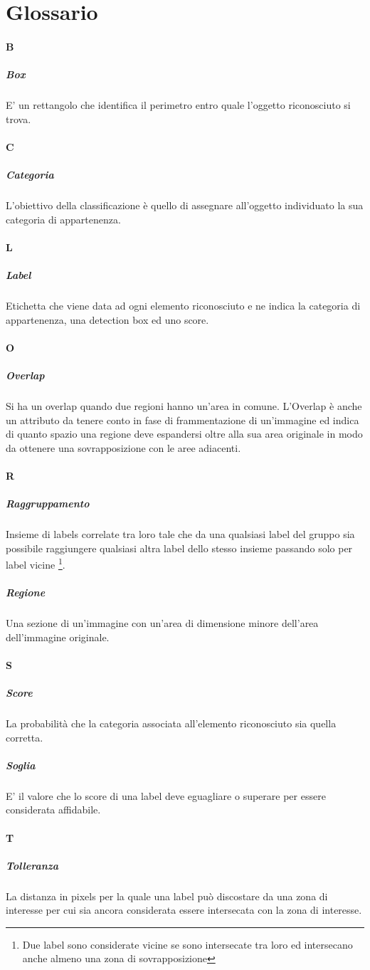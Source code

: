 \section{Glossario}

\paragraph{B}
\subparagraph{Box}
E' un rettangolo che identifica il perimetro entro quale l'oggetto riconosciuto si trova.

\paragraph{C}
\subparagraph{Categoria}
L'obiettivo della classificazione è quello di assegnare all'oggetto individuato la sua categoria di appartenenza.

\paragraph{L}
\subparagraph{Label}
Etichetta che viene data ad ogni elemento riconosciuto e ne indica la categoria di appartenenza, una detection box ed uno score.

\paragraph{O}
\subparagraph{Overlap} Si ha un overlap quando due regioni hanno un'area in comune. L'Overlap è anche un attributo da tenere conto in fase di frammentazione di un'immagine ed indica di quanto spazio una regione deve espandersi oltre alla sua area originale in modo da ottenere una sovrapposizione con le aree adiacenti.

\paragraph{R}
\subparagraph{Raggruppamento}
Insieme di labels correlate tra loro tale che da una qualsiasi label del gruppo sia possibile raggiungere qualsiasi altra label dello stesso insieme passando solo per label vicine \footnote{Due label sono considerate vicine se sono intersecate tra loro ed intersecano anche almeno una zona di sovrapposizione}.
\subparagraph{Regione} Una sezione di un'immagine con un'area di dimensione minore dell'area dell'immagine originale.

\paragraph{S}
\subparagraph{Score} La probabilità che la categoria associata all'elemento riconosciuto sia quella corretta.
\subparagraph{Soglia} E' il valore che lo score di una label deve eguagliare o superare per essere considerata affidabile.

\paragraph{T}
\subparagraph{Tolleranza} La distanza in pixels per la quale una label può discostare da una zona di interesse per cui sia ancora considerata essere intersecata con la zona di interesse.

